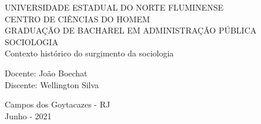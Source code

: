 \begin{center}
    {\large UNIVERSIDADE ESTADUAL DO NORTE FLUMINENSE}
    \\[0.2cm]
    {\large CENTRO DE CIÊNCIAS DO HOMEM}
    \\[0.2cm]
    {\large GRADUAÇÃO DE BACHAREL EM ADMINISTRAÇÃO PÚBLICA}
    \\[0.2cm]
    {\large SOCIOLOGIA}
    \\[8cm]
    { \huge Contexto histórico do surgimento da sociologia}
    \\[4cm]
\end{center}

\begin{flushleft}
    Docente: João Boechat\\[.2cm]
    Discente: Wellington Silva\\[4cm]
\end{flushleft}

\begin{center}
    {\large Campos dos Goytacazes - RJ}\\[0.2cm]
    {\large Junho - 2021}
\end{center}